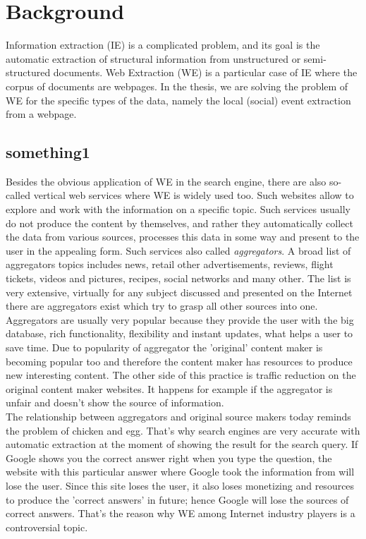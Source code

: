 \chapter{Background}
Information extraction (IE) is a complicated problem, and its goal is the automatic extraction of structural information from unstructured or semi-structured documents. Web Extraction (WE) is a particular case of IE where the corpus of documents are webpages. In the thesis, we are solving the problem of WE for the specific types of the data, namely the local (social) event extraction from a webpage.   


\section{something1}
Besides the obvious application of WE in the search engine, there are also so-called vertical web services where WE is widely used too. Such websites allow to explore and work with the information on a specific topic. Such services usually do not produce the content by themselves, and rather they automatically collect the data from various sources, processes this data in some way and present to the user in the appealing form. Such services also called \textit{aggregators}. A broad list of aggregators topics includes news, retail other advertisements, reviews, flight tickets, videos and pictures, recipes, social networks and many other. The list is very extensive, virtually for any subject discussed and presented on the Internet there are aggregators exist which try to grasp all other sources into one. \\

Aggregators are usually very popular because they provide the user with the big database, rich functionality, flexibility and instant updates, what helps a user to save time. Due to popularity of aggregator the 'original' content maker is becoming popular too and therefore the content maker has resources to produce new interesting content. The other side of this practice is traffic reduction on the original content maker websites. It happens for example if the aggregator is unfair and doesn't show the source of information. \\

The relationship between aggregators and original source makers today reminds the problem of chicken and egg. That's why search engines are very accurate with automatic extraction at the moment of showing the result for the search query. If Google shows you the correct answer right when you type the question, the website with this particular answer where Google took the information from will lose the user. Since this site loses the user, it also loses monetizing and resources to produce the 'correct answers' in future; hence Google will lose the sources of correct answers. That's the reason why WE among Internet industry players is a controversial topic.\\

